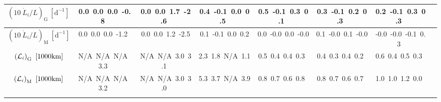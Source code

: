 \begin{table}[H]
{\begin{centering}
\begin{tabular}{|c|c|c|c|c|c|c|c|}
\hline
$\left(10\ \dot{L}_{i}/L\right)_{\mathrm{G}}\ \left[\mathrm{d^{-1}}\right]$ & \textcolor{C1}{0.0}\ \textcolor{C2}{0.0}\ \textcolor{C3}{0.0}\ \textcolor{C4}{-0.8}\  & \textcolor{C1}{0.0}\ \textcolor{C2}{0.0}\ \textcolor{C3}{1.7}\ \textcolor{C4}{-2.6}\  & \textcolor{C1}{0.4}\ \textcolor{C2}{-0.1}\ \textcolor{C3}{0.0}\ \textcolor{C4}{0.5}\  & \textcolor{C1}{0.5}\ \textcolor{C2}{-0.1}\ \textcolor{C3}{0.3}\ \textcolor{C4}{0.1}\  & \textcolor{C1}{0.3}\ \textcolor{C2}{-0.1}\ \textcolor{C3}{0.2}\ \textcolor{C4}{0.3}\  & \textcolor{C1}{0.2}\ \textcolor{C2}{-0.1}\ \textcolor{C3}{0.3}\ \textcolor{C4}{0.3}\  \tabularnewline
\hline
$\left(10\ \dot{L}_{i}/L\right)_{\mathrm{M}}\ \left[\mathrm{d^{-1}}\right]$ & \textcolor{C1}{0.0}\ \textcolor{C2}{0.0}\ \textcolor{C3}{0.0}\ \textcolor{C4}{-1.2}\  & \textcolor{C1}{0.0}\ \textcolor{C2}{0.0}\ \textcolor{C3}{1.2}\ \textcolor{C4}{-2.5}\  & \textcolor{C1}{0.1}\ \textcolor{C2}{-0.1}\ \textcolor{C3}{0.0}\ \textcolor{C4}{0.2}\  & \textcolor{C1}{0.0}\ \textcolor{C2}{-0.0}\ \textcolor{C3}{0.0}\ \textcolor{C4}{-0.0}\  & \textcolor{C1}{0.1}\ \textcolor{C2}{-0.0}\ \textcolor{C3}{0.1}\ \textcolor{C4}{-0.0}\  & \textcolor{C1}{-0.0}\ \textcolor{C2}{-0.0}\ \textcolor{C3}{-0.1}\ \textcolor{C4}{0.3}\  \tabularnewline
\hline
$\left({\cal L}_{i}\right)_{\mathrm{G}}\ \left[1000\mathrm{km}\right]$ & \textcolor{C1}{N/A}\ \textcolor{C2}{N/A}\ \textcolor{C3}{N/A}\ \textcolor{C4}{3.3}\  & \textcolor{C1}{N/A}\ \textcolor{C2}{N/A}\ \textcolor{C3}{3.0}\ \textcolor{C4}{3.1}\  & \textcolor{C1}{2.3}\ \textcolor{C2}{1.8}\ \textcolor{C3}{N/A}\ \textcolor{C4}{1.1}\  & \textcolor{C1}{0.5}\ \textcolor{C2}{0.4}\ \textcolor{C3}{0.4}\ \textcolor{C4}{0.3}\  & \textcolor{C1}{0.4}\ \textcolor{C2}{0.3}\ \textcolor{C3}{0.4}\ \textcolor{C4}{0.2}\  & \textcolor{C1}{0.6}\ \textcolor{C2}{0.4}\ \textcolor{C3}{0.5}\ \textcolor{C4}{0.3}\  \tabularnewline
\hline
$\left({\cal L}_{i}\right)_{\mathrm{M}}\ \left[1000\mathrm{km}\right]$ & \textcolor{C1}{N/A}\ \textcolor{C2}{N/A}\ \textcolor{C3}{N/A}\ \textcolor{C4}{3.2}\  & \textcolor{C1}{N/A}\ \textcolor{C2}{N/A}\ \textcolor{C3}{3.0}\ \textcolor{C4}{3.0}\  & \textcolor{C1}{5.3}\ \textcolor{C2}{3.7}\ \textcolor{C3}{N/A}\ \textcolor{C4}{3.9}\  & \textcolor{C1}{0.8}\ \textcolor{C2}{0.7}\ \textcolor{C3}{0.6}\ \textcolor{C4}{0.8}\  & \textcolor{C1}{0.8}\ \textcolor{C2}{0.7}\ \textcolor{C3}{0.6}\ \textcolor{C4}{0.7}\  & \textcolor{C1}{1.0}\ \textcolor{C2}{1.0}\ \textcolor{C3}{1.2}\ \textcolor{C4}{0.0}\  \tabularnewline
\hline
 &  &  &  &  &  & \tabularnewline
\hline
\end{tabular}
\par\end{centering} }
\end{table}
